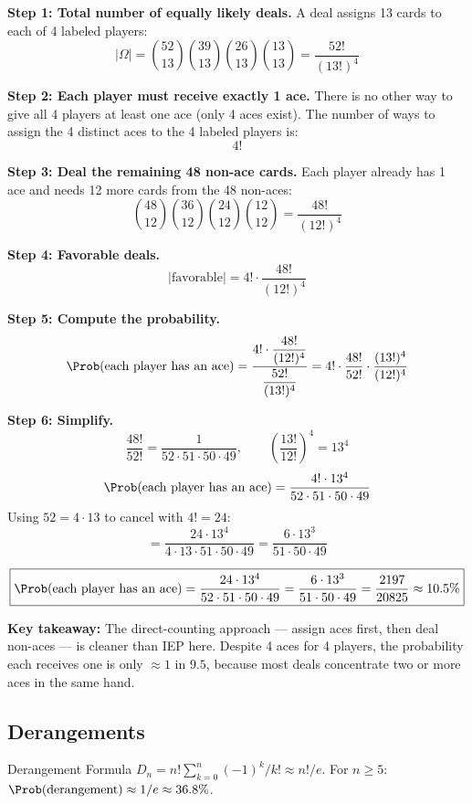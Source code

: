 \documentclass[11pt]{article}
\begin{document}
\begin{solutionbox}
\textbf{Step 1: Total number of equally likely deals.}
A deal assigns 13 cards to each of 4 labeled players:
\[
  |\Omega| = \binom{52}{13}\binom{39}{13}\binom{26}{13}\binom{13}{13}
  = \frac{52!}{(13!)^4}
\]

\textbf{Step 2: Each player must receive exactly 1 ace.}
There is no other way to give all 4 players at least one ace (only 4 aces exist).
The number of ways to assign the 4 distinct aces to the 4 labeled players is:
\[
  4!
\]

\textbf{Step 3: Deal the remaining 48 non-ace cards.}
Each player already has 1 ace and needs 12 more cards from the 48 non-aces:
\[
  \binom{48}{12}\binom{36}{12}\binom{24}{12}\binom{12}{12}
  = \frac{48!}{(12!)^4}
\]

\textbf{Step 4: Favorable deals.}
\[
  |\text{favorable}| = 4!\cdot\frac{48!}{(12!)^4}
\]

\textbf{Step 5: Compute the probability.}
\[
  \Prob(\text{each player has an ace})
  = \frac{4!\cdot\dfrac{48!}{(12!)^4}}{\dfrac{52!}{(13!)^4}}
  = 4!\cdot\frac{48!}{52!}\cdot\frac{(13!)^4}{(12!)^4}
\]

\textbf{Step 6: Simplify.}
\[
  \frac{48!}{52!} = \frac{1}{52\cdot51\cdot50\cdot49},
  \qquad
  \left(\frac{13!}{12!}\right)^4 = 13^4
\]
\[
  \Prob(\text{each player has an ace})
  = \frac{4!\cdot 13^4}{52\cdot51\cdot50\cdot49}
\]
Using $52 = 4\cdot13$ to cancel with $4! = 24$:
\[
  = \frac{24\cdot13^4}{4\cdot13\cdot51\cdot50\cdot49}
  = \frac{6\cdot13^3}{51\cdot50\cdot49}
\]

\[
  \boxed{
  \Prob(\text{each player has an ace})
  = \frac{24\cdot 13^4}{52\cdot 51\cdot 50\cdot 49}
  = \frac{6\cdot 13^3}{51\cdot 50\cdot 49}
  = \frac{2197}{20825}
  \approx 10.5\%
  }
\]

\textbf{Key takeaway:} The direct-counting approach --- assign aces first,
then deal non-aces --- is cleaner than IEP here. Despite 4 aces for 4 players,
the probability each receives one is only $\approx 1$ in $9.5$, because most
deals concentrate two or more aces in the same hand.
\end{solutionbox}

\subsection{Derangements}

\begin{keyresult}{Derangement Formula}
$D_n = n!\sum_{k=0}^{n}(-1)^k/k!\approx n!/e$.
For $n\geq5$: $\Prob(\text{derangement})\approx1/e\approx36.8\%$.
\end{keyresult}
\end{document}
